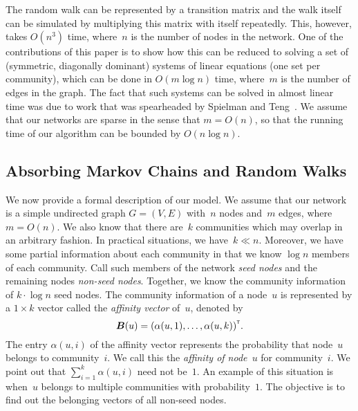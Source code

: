 The random walk can be represented by a transition matrix and the walk itself can be simulated 
by multiplying this matrix with itself repeatedly. This, however, takes $O(n^3)$
time, where~$n$ is the number of nodes in the network. One of the contributions of 
this paper is to show how this can be reduced to solving a set of (symmetric, diagonally dominant) 
systems of linear equations (one set per community), which can be done in $O(m \log n)$ time, 
where~$m$ is the number of edges in the graph. The fact that such systems can be solved in 
almost linear time was due to work that was spearheaded by Spielman and 
Teng~\cite{ST04,EEST05,ST08,KMP10,KMP11,Vis13}. We assume that our networks are 
sparse in the sense that $m = O(n)$, so that the running time of our algorithm can  
be bounded by $O(n \log n)$.    
        
\subsection{Absorbing Markov Chains and Random Walks}
We now provide a formal description of our model. We assume that our network 
is a simple undirected graph $G = (V,E)$ with~$n$ nodes and~$m$ edges, where $m = O(n)$.
We also know that there are~$k$ communities which may overlap in an arbitrary fashion.
In practical situations, we have~$k \ll n$. 
Moreover, we have some partial information about each community in that we know
$\log n$ members of each community. Call such members of the network \emph{seed nodes} 
and the remaining nodes \emph{non-seed nodes}. Together, we know the community information 
of $k \cdot \log n$ seed nodes. The community information of a node~$u$ is represented 
by a $1 \times k$ vector called the \emph{affinity vector} of~$u$, denoted 
by 
\[
	\boldsymbol{B} (u) = {\left ( \alpha (u, 1), \ldots, \alpha (u, k) \right )}^{\scriptscriptstyle \mathsf{T}}.
\] 
The entry $\alpha (u, i)$ of the affinity vector represents the probability that 
node~$u$ belongs to community~$i$.  We call this the \emph{affinity of node~$u$} for 
community~$i$. We point out that $\sum_{i = 1}^k \alpha (u, i)$ 
need not be~$1$. An example of this situation is when~$u$ belongs to multiple 
communities with probability~$1$. The objective is to find out the belonging 
vectors of all non-seed nodes. 

